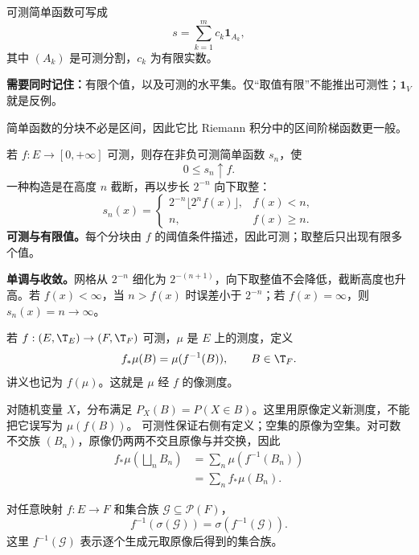 可测简单函数可写成
\[
s=\sum_{k=1}^{m}c_k\mathbf1_{A_k},
\]
其中 $(A_k)$ 是可测分割，$c_k$ 为有限实数。

\textbf{需要同时记住：}有限个值，以及可测的水平集。仅“取值有限”不能推出可测性；$\mathbf1_V$ 就是反例。

简单函数的分块不必是区间，因此它比 Riemann 积分中的区间阶梯函数更一般。

若 $f:E\to[0,+\infty]$ 可测，则存在非负可测简单函数 $s_n$，使
\[
0\le s_n\uparrow f.
\]
一种构造是在高度 $n$ 截断，再以步长 $2^{-n}$ 向下取整：
\[
s_n(x)=
\begin{cases}
2^{-n}\lfloor2^nf(x)\rfloor,& f(x)<n,\\
n,& f(x)\ge n.
\end{cases}
\]
\textbf{可测与有限值。}每个分块由 $f$ 的阈值条件描述，因此可测；取整后只出现有限多个值。

\textbf{单调与收敛。}网格从 $2^{-n}$ 细化为 $2^{-(n+1)}$，向下取整值不会降低，截断高度也升高。若 $f(x)<\infty$，当 $n>f(x)$ 时误差小于 $2^{-n}$；若 $f(x)=\infty$，则 $s_n(x)=n\to\infty$。

若 $f:(E,\T_E)\to(F,\T_F)$ 可测，$\mu$ 是 $E$ 上的测度，定义
\[
f_*\mu(B)=\mu(f^{-1}(B)),\qquad B\in\T_F.
\]
讲义也记为 $f(\mu)$。这就是 $\mu$ 经 $f$ 的像测度。

对随机变量 $X$，分布满足 $P_X(B)=P(X\in B)$。这里用原像定义新测度，不能把它误写为 $\mu(f(B))$。
可测性保证右侧有定义；空集的原像为空集。对可数不交族 $(B_n)$，原像仍两两不交且原像与并交换，因此
\[
\begin{aligned}
f_*\mu\!\left(\bigsqcup_n B_n\right)
&=\sum_n\mu(f^{-1}(B_n))\\
&=\sum_n f_*\mu(B_n).
\end{aligned}
\]

对任意映射 $f:E\to F$ 和集合族 $\mathcal G\subseteq\mathcal P(F)$，
\[
f^{-1}(\sigma(\mathcal G))
=\sigma(f^{-1}(\mathcal G)).
\]
这里 $f^{-1}(\mathcal G)$ 表示逐个生成元取原像后得到的集合族。

